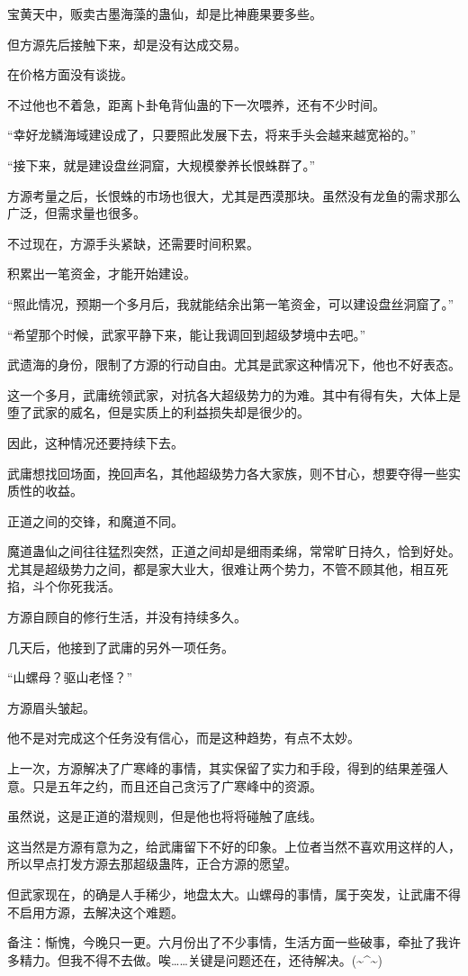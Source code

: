 \begin{this_body}
宝黄天中，贩卖古墨海藻的蛊仙，却是比神鹿果要多些。

但方源先后接触下来，却是没有达成交易。

在价格方面没有谈拢。

不过他也不着急，距离卜卦龟背仙蛊的下一次喂养，还有不少时间。

“幸好龙鳞海域建设成了，只要照此发展下去，将来手头会越来越宽裕的。”

“接下来，就是建设盘丝洞窟，大规模豢养长恨蛛群了。”

方源考量之后，长恨蛛的市场也很大，尤其是西漠那块。虽然没有龙鱼的需求那么广泛，但需求量也很多。

不过现在，方源手头紧缺，还需要时间积累。

积累出一笔资金，才能开始建设。

“照此情况，预期一个多月后，我就能结余出第一笔资金，可以建设盘丝洞窟了。”

“希望那个时候，武家平静下来，能让我调回到超级梦境中去吧。”

武遗海的身份，限制了方源的行动自由。尤其是武家这种情况下，他也不好表态。

这一个多月，武庸统领武家，对抗各大超级势力的为难。其中有得有失，大体上是堕了武家的威名，但是实质上的利益损失却是很少的。

因此，这种情况还要持续下去。

武庸想找回场面，挽回声名，其他超级势力各大家族，则不甘心，想要夺得一些实质性的收益。

正道之间的交锋，和魔道不同。

魔道蛊仙之间往往猛烈突然，正道之间却是细雨柔绵，常常旷日持久，恰到好处。尤其是超级势力之间，都是家大业大，很难让两个势力，不管不顾其他，相互死掐，斗个你死我活。

方源自顾自的修行生活，并没有持续多久。

几天后，他接到了武庸的另外一项任务。

“山螺母？驱山老怪？”

方源眉头皱起。

他不是对完成这个任务没有信心，而是这种趋势，有点不太妙。

上一次，方源解决了广寒峰的事情，其实保留了实力和手段，得到的结果差强人意。只是五年之约，而且还自己贪污了广寒峰中的资源。

虽然说，这是正道的潜规则，但是他也将将碰触了底线。

这当然是方源有意为之，给武庸留下不好的印象。上位者当然不喜欢用这样的人，所以早点打发方源去那超级蛊阵，正合方源的愿望。

但武家现在，的确是人手稀少，地盘太大。山螺母的事情，属于突发，让武庸不得不启用方源，去解决这个难题。

备注：惭愧，今晚只一更。六月份出了不少事情，生活方面一些破事，牵扯了我许多精力。但我不得不去做。唉……关键是问题还在，还待解决。(\~{}\^{}\~{})

\end{this_body}


